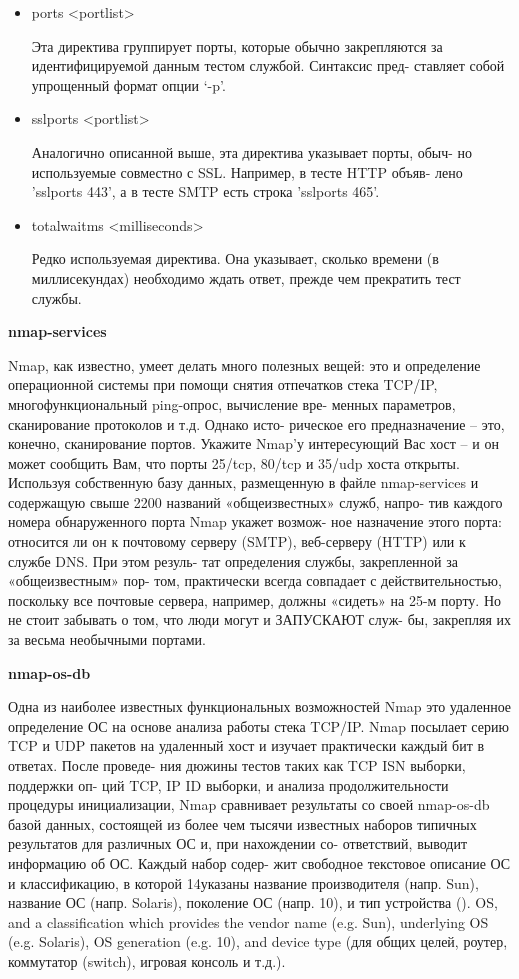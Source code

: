 \documentclass[12pt,a4paper]{article}
\begin{document}
\begin{itemize}
\item ports <portlist>

Эта директива группирует порты, которые обычно закрепляются
за идентифицируемой данным тестом службой. Синтаксис пред-
ставляет собой упрощенный формат опции ‘-p’.

\item sslports <portlist>

Аналогично описанной выше, эта директива указывает порты, обыч-
но используемые совместно с SSL. Например, в тесте HTTP объяв-
лено ’sslports 443’, а в тесте SMTP есть строка ’sslports 465’.

\item totalwaitms <milliseconds>

Редко используемая директива. Она указывает, сколько времени (в
миллисекундах) необходимо ждать ответ, прежде чем прекратить
тест службы.
\end{itemize}

\textbf{nmap-services}

Nmap, как известно, умеет делать много полезных вещей: это и
определение операционной системы при помощи снятия отпечатков
стека TCP/IP, многофункциональный ping-опрос, вычисление вре-
менных параметров, сканирование протоколов и т.д. Однако исто-
рическое его предназначение – это, конечно, сканирование портов.
Укажите Nmap’у интересующий Вас хост – и он может сообщить
Вам, что порты 25/tcp, 80/tcp и 35/udp хоста открыты. Используя
собственную базу данных, размещенную в файле nmap-services и
содержащую свыше 2200 названий «общеизвестных» служб, напро-
тив каждого номера обнаруженного порта Nmap укажет возмож-
ное назначение этого порта: относится ли он к почтовому серверу
(SMTP), веб-серверу (HTTP) или к службе DNS. При этом резуль-
тат определения службы, закрепленной за «общеизвестным» пор-
том, практически всегда совпадает с действительностью, поскольку
все почтовые сервера, например, должны «сидеть» на 25-м порту.
Но не стоит забывать о том, что люди могут и ЗАПУСКАЮТ служ-
бы, закрепляя их за весьма необычными портами.

\textbf{nmap-os-db}

Одна из наиболее известных функциональных возможностей Nmap
это удаленное определение ОС на основе анализа работы стека
TCP/IP. Nmap посылает серию TCP и UDP пакетов на удаленный
хост и изучает практически каждый бит в ответах. После проведе-
ния дюжины тестов таких как TCP ISN выборки, поддержки оп-
ций TCP, IP ID выборки, и анализа продолжительности процедуры
инициализации, Nmap сравнивает результаты со своей nmap-os-db
базой данных, состоящей из более чем тысячи известных наборов
типичных результатов для различных ОС и, при нахождении со-
ответствий, выводит информацию об ОС. Каждый набор содер-
жит свободное текстовое описание ОС и классификацию, в которой
14указаны название производителя (напр. Sun), название ОС (напр.
Solaris), поколение ОС (напр. 10), и тип устройства (). OS, and a
classification which provides the vendor name (e.g. Sun), underlying
OS (e.g. Solaris), OS generation (e.g. 10), and device type (для общих
целей, роутер, коммутатор (switch), игровая консоль и т.д.).
\end{document}
